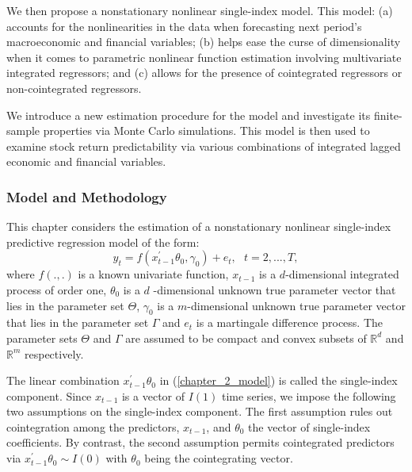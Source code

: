 \documentclass[a4paper,12pt,times,numbered,print,index]{report}
\numberwithin{equation}{section}
\begin{document}
	We then propose a nonstationary nonlinear single-index model. This model: (a) accounts for the nonlinearities in the data when forecasting next period's macroeconomic and financial variables; (b) helps ease the curse of dimensionality when it comes to parametric nonlinear function estimation involving multivariate integrated regressors; and (c) allows for the presence of cointegrated regressors or non-cointegrated regressors.
	
	
	We introduce a new estimation procedure for the model and investigate its finite-sample properties via Monte Carlo simulations. This model is then used to examine stock return predictability via various combinations of integrated lagged economic and financial variables.
	
	\subsubsection*{Model and Methodology}
	This chapter considers the estimation of a nonstationary nonlinear single-index predictive regression model of the form:
	\begin{equation}
		y_{t}=f\left( x_{t-1}^{\prime }\theta _{0},\gamma _{0}\right) +e_{t},\ \ \
		t=2,...,T, 
		\label{chapter_2_model}
	\end{equation}
	where $f\left( .,.\right) $ is a known univariate function, $x_{t-1}$ is a $d
	$-dimensional integrated process of order one, $\theta _{0}$ is a $d$%
	-dimensional unknown true parameter vector that lies in the parameter set $%
	\Theta $, $\gamma _{0}$ is a $m$-dimensional unknown true parameter vector
	that lies in the parameter set $\Gamma $ and $e_{t}$ is a martingale
	difference process. The parameter sets $\Theta $ and $\Gamma $ are assumed
	to be compact and convex subsets of $\mathbb{R}^{d}$ and $\mathbb{R}^{m}$
	respectively.
	
	The linear combination $x_{t-1}^{\prime }\theta _{0}$ in (\ref{chapter_2_model}) is
	called the single-index component. Since $x_{t-1}$ is a vector of $I(1)$ time series, we impose the following two assumptions on the single-index component. The first assumption rules out cointegration among the predictors, $x_{t-1}$, and $\theta_{0}$ the vector of
	single-index coefficients. By contrast, the second assumption permits cointegrated predictors via $x_{t-1}^{\prime }\theta _{0}\sim
	I\left( 0\right) $ with $\theta _{0}$ being the cointegrating vector. 
	
\end{document}
